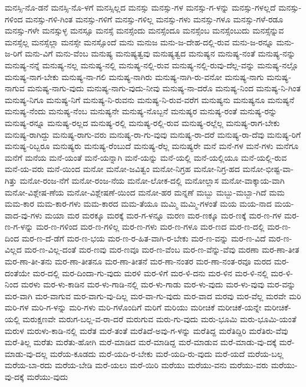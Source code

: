 {ಮನಸ್ಸಿ-ನೊ-ಡನೆ
ಮನಸ್ಸಿ-ನೊ-ಳಗೆ
ಮನಸ್ಸಿಲ್ಲದ
ಮನಸ್ಸು
ಮನಸ್ಸು-ಗಳ
ಮನಸ್ಸು-ಗ-ಳನ್ನು
ಮನಸ್ಸು-ಗಳಲ್ಲದೆ
ಮನಸ್ಸು-ಗಳಿಂದ
ಮನಸ್ಸು-ಗಳಿ-ಗಿಂತ
ಮನಸ್ಸು-ಗಳಿಗೆ
ಮನಸ್ಸು-ಗಳಿಲ್ಲ
ಮನಸ್ಸು-ಗಳು
ಮನಸ್ಸು-ಗಳೂ
ಮನಸ್ಸು-ಗಳೆ-ರಡೂ
ಮನಸ್ಸು-ಗಳೇ
ಮನಸ್ಸುಳ್ಳ
ಮನಸ್ಸೂ
ಮನಸ್ಸೆ
ಮನಸ್ಸೆಂದು
ಮನಸ್ಸೆಂದೂ
ಮನಸ್ಸೆಂಬ
ಮನಸ್ಸೆಂಬುದು
ಮನಸ್ಸೆನ್ನುವ
ಮನಸ್ಸೆಲ್ಲ
ಮನಸ್ಸೆಲ್ಲಾ
ಮನಸ್ಸೇ
ಮನಸ್ಸೊಂದೆ
ಮನು
ಮನುಜ
ಮನು-ಜ-ದೇಹ-ದಲ್ಲಿ-ರುವ
ಮನು-ಜ-ರನ್ನೂ
ಮನು-ಜ-ರಿಗೆ
ಮನು-ವಿಗೆ
ಮನು-ವೆಂಬ
ಮನುಷ್ಯ
ಮನುಷ್ಯತ್ವವು
ಮನುಷ್ಯತ್ವದ
ಮನುಷ್ಯನ
ಮನುಷ್ಯ-ನಂತೆ
ಮನುಷ್ಯ-ನನ್ನು
ಮನುಷ್ಯ-ನನ್ನೆ
ಮನುಷ್ಯ-ನಲ್ಲ
ಮನುಷ್ಯ-ನಲ್ಲಿ
ಮನುಷ್ಯ-ನಲ್ಲಿ-ರುವ
ಮನುಷ್ಯ-ನಲ್ಲಿ-ರುವು-ದೆಲ್ಲ-ವನ್ನು
ಮನುಷ್ಯ-ನಲ್ಲೊ
ಮನುಷ್ಯ-ನಾಗ-ಬೇಕು
ಮನುಷ್ಯ-ನಾ-ಗಲಿ
ಮನುಷ್ಯ-ನಾಗಿರು
ಮನುಷ್ಯ-ನಾಗಿ-ರು-ವನೋ
ಮನುಷ್ಯ-ನಾಗು
ಮನುಷ್ಯ-ನಾಗುವ
ಮನುಷ್ಯ-ನಾಗು-ವುದು
ಮನುಷ್ಯ-ನಾಗು-ವುದು-ನೀವು
ಮನುಷ್ಯ-ನಾ-ದರೊ
ಮನುಷ್ಯ-ನಿಂದ
ಮನುಷ್ಯ-ನಿ-ಗಿಂತ
ಮನುಷ್ಯ-ನಿಗೂ
ಮನುಷ್ಯ-ನಿಗೆ
ಮನುಷ್ಯ-ನಿ-ರುವನು
ಮನುಷ್ಯ-ನಿ-ರುವ-ವರೆಗ
ಮನುಷ್ಯನು
ಮನುಷ್ಯನೂ
ಮನುಷ್ಯನೆ
ಮನುಷ್ಯ-ನೆಂದು
ಮನುಷ್ಯ-ನೆಂಬ
ಮನುಷ್ಯನೇ
ಮನುಷ್ಯ-ನೊಬ್ಬನೆ
ಮನುಷ್ಯರ
ಮನುಷ್ಯ-ರಂತೆ
ಮನುಷ್ಯ-ರನ್ನು
ಮನುಷ್ಯ-ರನ್ನೂ
ಮನುಷ್ಯ-ರಲ್ಲದ
ಮನುಷ್ಯ-ರಲ್ಲಿ
ಮನುಷ್ಯ-ರಲ್ಲಿ-ರುವ
ಮನುಷ್ಯ-ರಲ್ಲೆಲ್ಲ
ಮನುಷ್ಯ-ರಾಗ-ಬೇಕು
ಮನುಷ್ಯ-ರಾಗಿದ್ದು
ಮನುಷ್ಯ-ರಾಗು-ವರು
ಮನುಷ್ಯ-ರಾ-ಗು-ವುವು
ಮನುಷ್ಯ-ರಾ-ದರೆ
ಮನುಷ್ಯ-ರಾ-ದೆವು
ಮನುಷ್ಯ-ರಿಗೆ
ಮನುಷ್ಯ-ರಿಬ್ಬರೂ
ಮನುಷ್ಯರು
ಮನುಷ್ಯ-ರೆಂಬುದೆ
ಮನುಷ್ಯ-ರೆಲ್ಲ
ಮನುಷ್ಯರೇ
ಮನೆ
ಮನೆ-ಗಳ
ಮನೆ-ಗಳು
ಮನೆಗೂ
ಮನೆಗೆ
ಮನೆಯ
ಮನೆ-ಯಂತೆ
ಮನೆ-ಯನ್ನಾಗಿ
ಮನೆ-ಯನ್ನು
ಮನೆ-ಯಲ್ಲಿ
ಮನೆ-ಯಲ್ಲಿಯೂ
ಮನೆ-ಯಲ್ಲಿ-ರುವ
ಮನೆ-ಯ-ವರು
ಮನೆ-ಯಿಂದ
ಮನೋ
ಮನೋ-ಜವಿತ್ವಂ
ಮನೋ-ನಿಗ್ರಹ
ಮನೋ-ನಿಗ್ರ-ಹದ
ಮನೋ-ಭೀಷ್ಟ-ವಾ-ಗಿತ್ತು
ಮನೋ-ರಂಜ-ನೆಗೆ
ಮನೋ-ರಂಜ-ನೆಯ
ಮನೋ-ಲೋಕ-ದಲ್ಲಿ
ಮನೋಲ್ಲಾಸ
ಮನೋ-ವಾಕ್ಕಾಯ-ವಾಗಿ
ಮನೋ-ವಿಶ್ಲೇಷ-ಣೆಯ
ಮನೋ-ವಿಶ್ಲೇಷಣೆ-ಯಿಂದ
ಮನೋ-ಹರ
ಮನ್ನಣೆ
ಮಬ್ಬು
ಮಬ್ಬು-ಮಬ್ಬಾ-ಗಿದೆ
ಮಮ
ಮಮ-ಕಾರ
ಮಮ-ಕಾರ-ಗಳು
ಮಮ-ಕಾರದ
ಮಮ-ತೆಯೂ
ಮಮ್ಮಿ
ಮಮ್ಮಿ-ಗಳಂತೆ
ಮಯ
ಮಯ-ನಾದ
ಮಯ-ವಾದ-ವು-ಗಳು
ಮಯಾ
ಮರ
ಮರಕ್ಕೂ
ಮರಕ್ಕೆ
ಮರ-ಗ-ಳನ್ನೂ
ಮರಣ
ಮರ-ಣಕ್ಕೂ
ಮರ-ಣಕ್ಕೆ
ಮರ-ಣ-ಗಳ
ಮರ-ಣ-ಗ-ಳನ್ನು
ಮರ-ಣ-ಗಳಿಂದ
ಮರ-ಣ-ಗಳಿಲ್ಲ
ಮರ-ಣ-ಗಳು
ಮರ-ಣ-ಗಳೂ
ಮರ-ಣದ
ಮರ-ಣ-ದಲ್ಲಿ
ಮರ-ಣ-ದಿಂದ
ಮರ-ಣ-ದೆ-ಡೆಗೆ
ಮರ-ಣ-ಭಯ
ಮರ-ಣ-ರ-ಹಿತ-ವಾಗಿ-ರ-ಬೇಕು
ಮರ-ಣ-ವನ್ನು
ಮರ-ಣ-ವಿದೆ
ಮರ-ಣ-ವಿಲ್ಲದ
ಮರ-ಣ-ವಿಲ್ಲ-ದಂತೆ
ಮರ-ಣವು
ಮರ-ಣವೂ
ಮರ-ಣ-ವೆಂಬ
ಮರ-ಣ-ವೆನ್ನು-ವೆವು
ಮರಣಾ
ಮರ-ಣಾ-ತೀತ
ಮರ-ಣಾ-ತೀ-ತನು
ಮರ-ಣಾ-ತೀತನೂ
ಮರ-ಣಾ-ತೀತನೆ
ಮರ-ಣಾ-ನಂತರ
ಮರ-ಣಾ-ನಂತ-ರವೂ
ಮರದ
ಮರ-ದಂತೆಯೇ
ಮರ-ದಲ್ಲಿ
ಮರ-ದಿಂದಾ-ಗು-ವುದು
ಮರಳಿ
ಮರ-ಳಿಗೆ
ಮರ-ಳಿ-ದನು
ಮರ-ಳಿನ
ಮರ-ಳಿ-ನಲ್ಲಿ
ಮರ-ಳಿ-ನಿಂದ
ಮರಳು
ಮರ-ಳು-ಕಾಡಿನ
ಮರ-ಳು-ಗಾಡಿ-ನಲ್ಲಿ
ಮರ-ಳು-ಗಾಡು
ಮರ-ಳು-ವುದು
ಮರ-ಳು-ವುವು
ಮರ-ವನ್ನು
ಮರ-ವಾಗಿ
ಮರ-ವಾಗುವ
ಮರ-ವಾಗು-ವು-ದಿಲ್ಲ
ಮರ-ವಾ-ಗು-ವುದು
ಮರ-ವಾದ
ಮರವು
ಮರ-ವೆಲ್ಲ
ಮರವೇ
ಮರಿ
ಮರಿ-ಗಳ
ಮರಿ-ಗ-ಳನ್ನು
ಮರಿ-ಗಳು
ಮರಿ-ಗಳೊಂದಿಗೆ
ಮರಿಗೆ
ಮರಿಯು
ಮರೀಚಿಕೆ
ಮರೀಚಿಕೆ-ಯನ್ನೇ
ಮರೀಚಿಕೆ-ಯಲ್ಲಿ
ಮರುಕ್ಷಣವೇ
ಮರುಗ-ಬಲ್ಲ-ವ-ರಾ-ದರೆ
ಮರುಗುವ
ಮರು-ಗು-ವುದು
ಮರು-ಭೂಮಿ
ಮರು-ಭೂಮಿ-ಯಂತೆ
ಮರುಳ
ಮರುಳು-ಕಾಡಿ-ನಲ್ಲಿ
ಮರೆತ
ಮರೆ-ತಂತೆ
ಮರೆತಿದೆ-ಅವು-ಗ-ಳನ್ನು
ಮರೆತಿದ್ದ
ಮರೆತಿದ್ದಿರಿ
ಮರೆತಿರು-ವೆವು
ಮರೆ-ತಿಲ್ಲ
ಮರೆತು
ಮರೆತು-ಹೋಗಿ
ಮರೆ-ಮಾಡಿದ
ಮರೆ-ಮಾಡಿದ್ದ
ಮರೆ-ಮಾಡುವ
ಮರೆ-ಮಾಡು-ವು-ದಕ್ಕೆ
ಮರೆ-ಮಾಡು-ವು-ದಲ್ಲ
ಮರೆಯ-ಕೂಡದು
ಮರೆ-ಯದಿ-ರ-ಬೇಕು
ಮರೆ-ಯದಿ-ರು-ವುದು
ಮರೆ-ಯದೆ
ಮರೆಯ-ಬಲ್ಲ
ಮರೆಯ-ಬಾ-ರದು
ಮರೆಯ-ಬೇಡಿ
ಮರೆ-ಯಲು
ಮರೆ-ಯಿರಿ
ಮರೆಯು
ಮರೆಯು-ವನು
ಮರೆಯು-ವರು
ಮರೆಯು-ವು-ದಕ್ಕೆ
ಮರೆಯು-ವುದು
}
